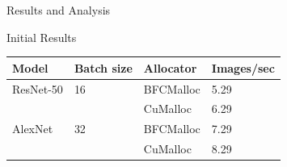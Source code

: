\documentclass[10pt]{beamer}
\newcommand{\resnettimebfc}{5.29}
\newcommand{\resnettimecuda}{6.29}
\newcommand{\alexnettimebfc}{7.29}
\newcommand{\alexnettimecuda}{8.29}
\begin{document}
\begin{frame}[fragile]{Results and Analysis}


\begin{exampleblock}{Initial Results}
    \begin{table}[!ht]
    \centering
    \label{tab:results}
    \begin{tabular}{|l|l|l|l|}
    \hline
    Model     & Batch size & Allocator & Images/sec         \\ \hline
    ResNet-50 & 16         & BFCMalloc & \resnettimebfc     \\ \cline{3-4} 
              &            & CuMalloc  & \resnettimecuda    \\ \hline
    AlexNet   & 32         & BFCMalloc & \alexnettimebfc    \\ \cline{3-4} 
              &            & CuMalloc  & \alexnettimecuda   \\ \hline
    \end{tabular}
    \end{table}
\end{exampleblock}

\end{frame}
\end{document}
